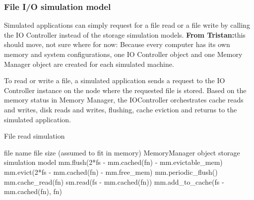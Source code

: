 \documentclass[conference]{IEEEtran}
\newcommand{\Desc}[2]{\State \makebox[2em][l]{#1}#2}
\newcommand{\tristan}[1]{\color{orange}\textbf{From Tristan:}#1\color{black}}
\begin{document}
			\subsubsection{File I/O simulation model}			
			
			Simulated applications can simply request for a file read 
			or a file write by calling the IO Controller instead of 
			the storage simulation models. 
			\tristan{this should move, not sure where for now: Because every computer has its own memory and system configurations, 
			one IO Controller object and one Memory Manager object are created 
			for each simulated machine.}
			
			To read or write a file, a simulated application sends a request to the 
			IO Controller instance on the node where the requested file is stored.
			Based on the memory status in Memory Manager, the IOController 
			orchestrates cache reads and writes, disk reads and writes, flushing, cache eviction 
			 and returns to the simulated application.
			
			\begin{algorithm}\caption{File read simulation}\label{alg:read}
				\small
				\begin{algorithmic}[1]
					\Input
        				\Desc{fn}{file name}
        				\Desc{fs}{file size (assumed to fit in memory)}
						\Desc{mm}{MemoryManager object}
						\Desc{sm}{storage simulation model}
   					\EndInput
					\State mm.flush(2*fs - mm.cached(fn) - mm.evictable\_mem) 
					\State mm.evict(2*fs - mm.cached(fn) - mm.free\_mem) 
					\State mm.periodic\_flush() 
					  
    					\State mm.cache\_read(fn)  
					\EndIf
					 
						\State sm.read(fs - mm.cached(fn)) 
						\State mm.add\_to\_cache(fs - mm.cached(fn), fn)
					\EndIf					
					
				\end{algorithmic}
			\end{algorithm}			
			
\end{document}
